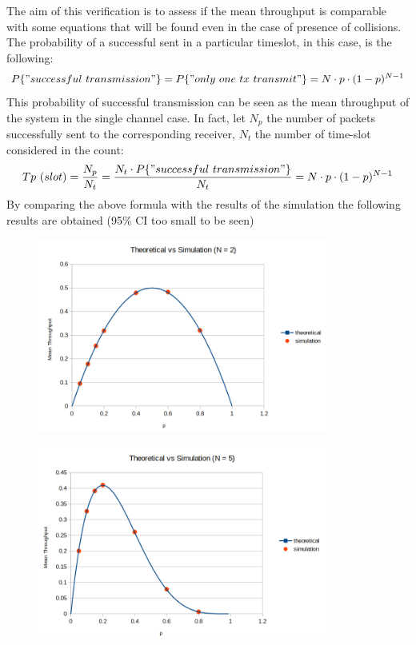 \noindent The aim of this verification is to assess if the mean throughput is comparable with some equations that will be found even in the case of presence of collisions. \\


\noindent The probability of a successful sent in a particular timeslot, in this case, is the following:
\begin{equation}
	P\{" successful\ transmission"\} = P\{"only\ one\ tx\ transmit"\} = N\cdot p \cdot(1-p)^{N-1}
\end{equation}
This probability of successful transmission can be seen as the mean throughput of the system in the single channel case. In fact, let $N_{p}$ the number of packets successfully sent to the corresponding receiver, $N_{t}$ the number of time-slot considered in the count:
\begin{align*}
Tp\ (slot) = \frac{N_{p}}{N_{t}} = \frac{N_{t}\cdot P\{"successful\ transmission"\}}{N_{t}} = N\cdot p\cdot (1-p)^{N-1}
\end{align*}
By comparing the above formula with the results of the simulation the following results are obtained (95\% CI too small to be seen)
\begin{figure}[H]
	\centering
	\includegraphics[width=0.85\textwidth]{img/SecondVerificationN2.png}
\end{figure}
\begin{figure}[H]
	\centering
	\includegraphics[width=0.85\textwidth]{img/SecondVerificationN5.png}
\end{figure}
